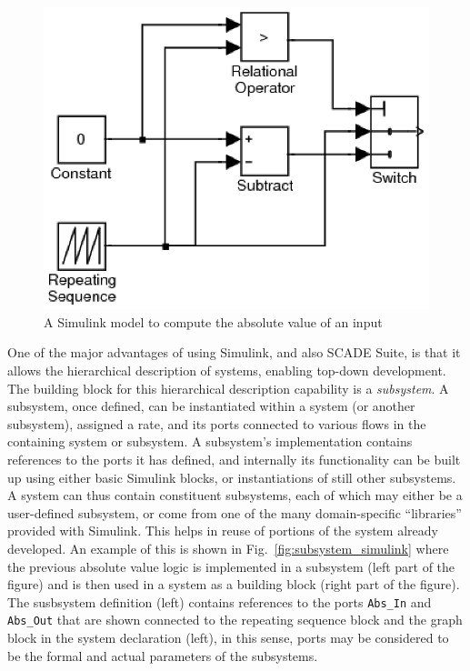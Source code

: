 \begin{figure}
\centering
\includegraphics[scale=0.5]{figs/abs_simulink}
\caption{A Simulink model to compute the absolute value of an input}
\label{fig:abs_simulink}
\end{figure}

One of the major advantages of using Simulink, and also SCADE Suite,
is that it allows the hierarchical description of systems, enabling
top-down development. The building block for this hierarchical
description capability is a \emph{subsystem}. A subsystem, once
defined, can be instantiated within a system (or another subsystem),
assigned a rate, and its ports connected to various flows in the
containing system or subsystem. A subsystem's implementation contains
references to the ports it has defined, and internally its
functionality can be built up using either basic Simulink blocks, or
instantiations of still other subsystems. A system can thus contain
constituent subsystems, each of which may either be a user-defined
subsystem, or come from one of the many domain-specific ``libraries''
provided with Simulink. This helps in reuse of portions of the system
already developed. An example of this is shown in
Fig.~\ref{fig:subsystem_simulink} where the previous absolute value
logic is implemented in a subsystem (left part of the figure) and is
then used in a system as a building block (right part of the
figure). The susbsystem definition (left) contains references to the
ports \texttt{Abs\_In} and \texttt{Abs\_Out} that are shown connected
to the repeating sequence block and the graph block in the system
declaration (left), in this sense, ports may be considered to be the
formal and actual parameters of the subsystems.

